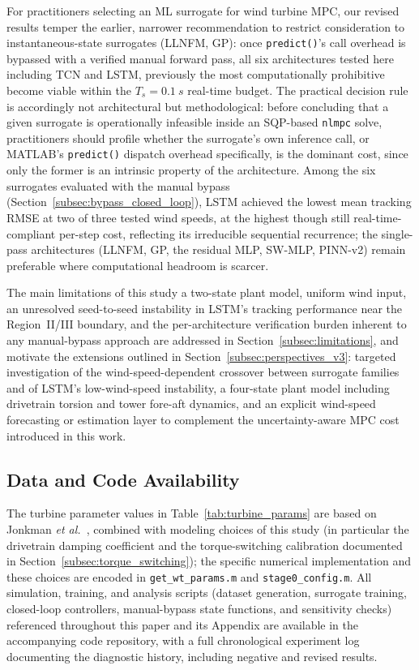 For practitioners selecting an ML surrogate for wind turbine MPC, our
revised results temper the earlier, narrower recommendation to restrict
consideration to instantaneous-state surrogates (LLNFM, GP): once
\texttt{predict()}'s call overhead is bypassed with a verified manual
forward pass, all six architectures tested here  including TCN and
LSTM, previously the most computationally prohibitive  become viable
within the $T_s=\SI{0.1}{s}$ real-time budget. The practical decision
rule is accordingly not architectural but methodological: before
concluding that a given surrogate is operationally infeasible inside an
SQP-based \texttt{nlmpc} solve, practitioners should profile whether
the surrogate's own inference call, or MATLAB's \texttt{predict()}
dispatch overhead specifically, is the dominant cost, since only the
former is an intrinsic property of the architecture. Among the six
surrogates evaluated with the manual bypass
(Section~\ref{subsec:bypass_closed_loop}), LSTM achieved the lowest
mean tracking RMSE at two of three tested wind speeds, at the highest
 though still real-time-compliant  per-step cost, reflecting its
irreducible sequential recurrence; the single-pass architectures
(LLNFM, GP, the residual MLP, SW-MLP, PINN-v2) remain preferable where
computational headroom is scarcer.

The main limitations of this study  a two-state plant model, uniform
wind input, an unresolved seed-to-seed instability in LSTM's tracking
performance near the Region~II/III boundary, and the per-architecture
verification burden inherent to any manual-bypass approach  are
addressed in Section~\ref{subsec:limitations}, and motivate the
extensions outlined in Section~\ref{subsec:perspectives_v3}: targeted
investigation of the wind-speed-dependent crossover between surrogate
families and of LSTM's low-wind-speed instability, a four-state plant
model including drivetrain torsion and tower fore-aft dynamics, and an
explicit wind-speed forecasting or estimation layer to complement the
uncertainty-aware MPC cost introduced in this work.

\subsection*{Data and Code Availability}

{\color{auditP2}The turbine parameter values in Table~\ref{tab:turbine_params} are based
on Jonkman \emph{et al.}~\cite{jonkman2009}, combined with modeling choices of this study (in
particular the drivetrain damping coefficient and the torque-switching
calibration documented in Section~\ref{subsec:torque_switching}); the
specific numerical implementation and these choices are encoded in
\texttt{get\_wt\_params.m} and \texttt{stage0\_config.m}.} All simulation,
training, and analysis scripts (dataset generation, surrogate training,
closed-loop controllers, manual-bypass state functions, and sensitivity
checks) referenced throughout this paper and its Appendix are available in
the accompanying code repository, with a full chronological experiment
log documenting the diagnostic history, including negative and revised
results.
